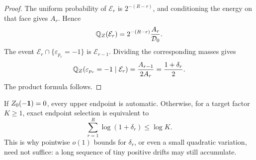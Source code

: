 \begin{proof}
The uniform probability of \(\mathcal E_r\) is \(2^{-(R-r)}\), and
conditioning the energy on that face gives \(A_r\).  Hence
\begin{equation}
 \mathbb Q_Z(\mathcal E_r)
 =2^{-(R-r)}\frac{A_r}{\mathcal D_0}.
 \label{eq:tpc44-face-event-mass}
\end{equation}
The event \(\mathcal E_r\cap\{\varepsilon_{p_r}=-1\}\) is
\(\mathcal E_{r-1}\).  Dividing the corresponding masses gives
\begin{equation}
 \mathbb Q_Z(\varepsilon_{p_r}=-1\mid\mathcal E_r)
 =\frac{A_{r-1}}{2A_r}=\frac{1+\delta_r}{2}.
 \label{eq:tpc44-face-conditional-ratio}
\end{equation}
The product formula follows.
\end{proof}

If \(Z_0(-\mathbf 1)=0\), every upper endpoint is automatic.  Otherwise, for
a target factor \(K\ge1\), exact endpoint selection is equivalent to
\begin{equation}
 \sum_{r=1}^{R}\log(1+\delta_r)\le\log K.
 \label{eq:tpc44-log-drift-criterion}
\end{equation}
This is why pointwise \(o(1)\) bounds for \(\delta_r\), or even a small
quadratic variation, need not suffice: a long sequence of tiny positive
drifts may still accumulate.
